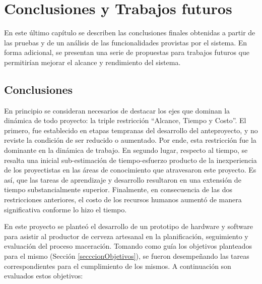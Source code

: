 \chapter{Conclusiones y Trabajos futuros}
\par
En este último capítulo se describen las conclusiones finales obtenidas a partir de las pruebas y de un análisis de las funcionalidades provistas por el sistema. En forma adicional, se presentan una serie de propuestas para trabajos futuros que permitirían mejorar el alcance y rendimiento del sistema.

\section{Conclusiones} %

\par En principio se consideran necesarios de destacar los ejes que dominan la dinámica de todo proyecto: la triple restricción ``Alcance, Tiempo y Costo''. El primero, fue establecido en etapas tempranas del desarrollo del anteproyecto, y no reviste la condición de ser reducido o aumentado. Por ende, esta restricción fue la dominante en la dinámica de trabajo. En segundo lugar, respecto al tiempo, se resalta una inicial sub-estimación de tiempo-esfuerzo producto de la inexperiencia de los proyectistas en las áreas de conocimiento que atravesaron este proyecto. Es así, que las tareas de aprendizaje y desarrollo resultaron en una extensión de tiempo substancialmente superior. Finalmente, en consecuencia de las dos restricciones anteriores, el costo de los recursos humanos aumentó de manera significativa conforme lo hizo el tiempo.

\par En este proyecto se planteó el desarrollo de un prototipo de hardware y software para asistir al productor de cerveza artesanal en la planificación, seguimiento y evaluación del proceso maceración. Tomando como guía los objetivos planteados para el mismo (Sección \ref{secccionObjetivos}), se fueron desempeñando las tareas correspondientes para el cumplimiento de los mismos. A continuación son evaluados estos objetivos:

